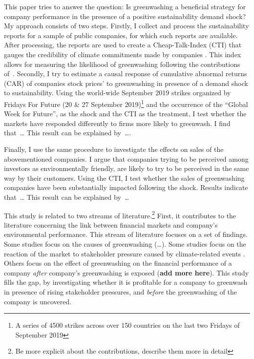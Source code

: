 \documentclass[12pt]{article}
\begin{document}
This paper tries to answer the question: Is greenwashing a beneficial strategy for company performance in the presence of a positive sustainability demand shock? My approach consists of two steps. Firstly, I collect and process the sustainability reports for a sample of public companies, for which such reports are available. After processing, the reports are used to create a Cheap-Talk-Index (CTI) that gauges the credibility of climate commitments made by companies \parencite{binglerHowCheapTalk2024}. This index allows for measuring the likelihood of greenwashing following the contributions of~\cite{coenAreCorporateClimate2022}. Secondly, I try to estimate a causal response of cumulative abnormal returns (CAR) of companies stock prices' to greenwashing in presence of a demand shock to sustainability. Using the world-wide September 2019 strikes organized by Fridays For Future (20 \& 27 September 2019)\footnote{A series of 4500 strikes across over 150 countries on the last two Fridays of September 2019} and the occurrence of the ``Global Week for Future'', as the shock and the CTI as the treatment, I test whether the markets have responded differently to firms more likely to greenwash. I find that\ \dots
This result can be explained by\ \dots.

Finally, I use the same procedure to investigate the effects on sales of the abovementioned companies. I argue that companies trying to be perceived among investors as environmentally friendly, are likely to try to be perceived in the same way by their customers. Using the CTI, I test whether the sales of greenwashing companies have been substantially impacted following the shock. Results indicate that\ \dots 
This result can be explained by\ \dots 
 

This study is related to two streams of literature.\footnote{Be more explicit about the contributions, describe them more in detail} First, it contributes to the literature concerning the link between financial markets and company's environmental performance. This stream of literature focuses on a set of findings. Some studies focus on the causes of greenwashing (\dots). Some studies focus on the reaction of the market to stakeholder pressure caused by climate-related events \parencite{birindelliJustBlahBlah2023,schusterStockPriceReactions2023, diaz-raineyTrumpVsParis2021, bouzzineStockPriceReactions2021,cartellierCanInvestorsCurb2023, }. Others focus on the effect of greenwashing on the financial performance of a company \textit{after} company's greenwashing is exposed \parencite{tetiDoesGreenwashingAffect2024, karpoffReputationalPenaltiesEnvironmental2005, konarDoesMarketValue2001,torelliGreenwashingEnvironmentalCommunication2020} (\textbf{add more here}). This study fills the gap, by investigating whether it is profitable for a company to greenwash in presence of rising stakeholder pressures, and \textit{before} the greenwashing of the company is uncovered.
\end{document}
